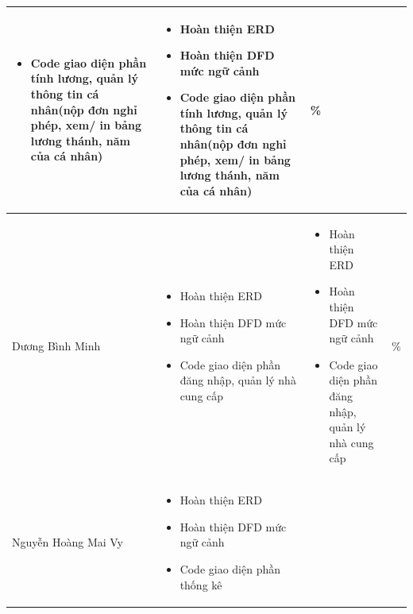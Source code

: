 \documentclass[a4paper,12pt]{report}
\begin{document}
\begin{center}
\begin{longtable}{|>{\centering\arraybackslash}p{3cm}|
        >{\centering\arraybackslash}p{5.5cm}|
        >{\centering\arraybackslash}p{5.5cm}|
        >{\centering\arraybackslash}p{1.5cm}|}
\begin{itemize}
            \item Code giao diện phần tính lương, quản lý thông tin cá nhân(nộp đơn nghỉ phép, xem/ in bảng lương thánh, năm của cá nhân)
        \end{itemize} &
        \begin{itemize}
            \item Hoàn thiện ERD
            \item Hoàn thiện DFD mức ngữ cảnh
            \item Code giao diện phần tính lương, quản lý thông tin cá nhân(nộp đơn nghỉ phép, xem/ in bảng lương thánh, năm của cá nhân)
        \end{itemize}
                                                                                                                                      & 100\% \\
        \hline
        Dương Bình Minh                                                                                                               &
        \begin{itemize}
            \item Hoàn thiện ERD
            \item Hoàn thiện DFD mức ngữ cảnh
            \item Code giao diện phần đăng nhập, quản lý nhà cung cấp
        \end{itemize}
                                                                                                                                      &
        \begin{itemize}
            \item Hoàn thiện ERD
            \item Hoàn thiện DFD mức ngữ cảnh
            \item Code giao diện phần đăng nhập, quản lý nhà cung cấp
        \end{itemize}
                                                                                                                                      & 100\% \\
        \hline
        Nguyễn Hoàng Mai Vy                                                                                                           &
        \begin{itemize}
            \item Hoàn thiện ERD
            \item Hoàn thiện DFD mức ngữ cảnh
            \item Code giao diện phần thống kê

\end{itemize}
\end{longtable}
\end{center}
\end{document}
